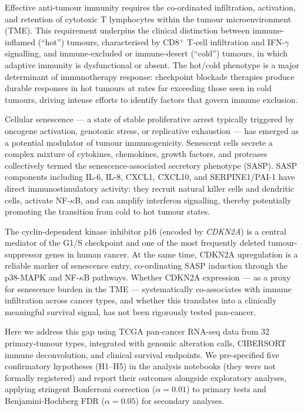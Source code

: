 \documentclass[10pt,twocolumn]{article}
\begin{document}
Effective anti-tumour immunity requires the co-ordinated infiltration,
activation, and retention of cytotoxic T lymphocytes within the tumour
microenvironment (TME). This requirement underpins the clinical
distinction between immune-inflamed (``hot'') tumours, characterised by
CD8$^+$ T-cell infiltration and IFN-$\gamma$ signalling, and
immune-excluded or immune-desert (``cold'') tumours, in which adaptive
immunity is dysfunctional or absent\cite{Chen2018}. The hot/cold
phenotype is a major determinant of immunotherapy response: checkpoint
blockade therapies produce durable responses in hot tumours at rates far
exceeding those seen in cold tumours, driving intense efforts to identify
factors that govern immune exclusion\cite{Sharma2017}.

Cellular senescence — a state of stable proliferative arrest typically
triggered by oncogene activation, genotoxic stress, or replicative
exhaustion — has emerged as a potential modulator of tumour
immunogenicity\cite{Coppé2010}. Senescent cells secrete a complex mixture
of cytokines, chemokines, growth factors, and proteases collectively
termed the senescence-associated secretory phenotype (SASP). SASP
components including IL-6, IL-8, CXCL1, CXCL10, and SERPINE1/PAI-1
have direct immunostimulatory activity: they recruit natural killer cells
and dendritic cells, activate NF-$\kappa$B, and can amplify interferon
signalling, thereby potentially promoting the transition from cold to hot
tumour states\cite{Acosta2013,Kuilman2008}.

The cyclin-dependent kinase inhibitor p16 (encoded by \textit{CDKN2A})
is a central mediator of the G1/S checkpoint and one of the most
frequently deleted tumour-suppressor genes in human
cancer\cite{Rayess2012}. At the same time, CDKN2A upregulation is a
reliable marker of senescence entry, co-ordinating SASP induction
through the p38-MAPK and NF-$\kappa$B pathways. Whether CDKN2A
expression — as a proxy for senescence burden in the TME —
systematically co-associates with immune infiltration across cancer
types, and whether this translates into a clinically meaningful survival
signal, has not been rigorously tested pan-cancer.

Here we address this gap using TCGA pan-cancer RNA-seq data from 32
primary-tumour types, integrated with genomic alteration calls, CIBERSORT immune
deconvolution, and clinical survival endpoints. We pre-specified five
confirmatory hypotheses (H1--H5) in the analysis notebooks (they were not
formally registered) and report their outcomes alongside
exploratory analyses, applying stringent Bonferroni correction
($\alpha=0.01$) to primary tests and Benjamini-Hochberg FDR
($\alpha=0.05$) for secondary analyses.
\end{document}
